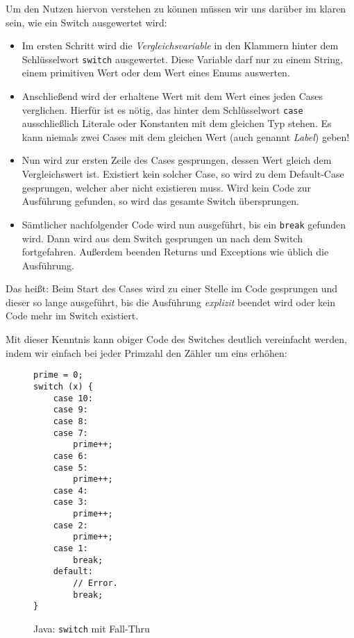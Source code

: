 		Um den Nutzen hiervon verstehen zu können müssen wir uns darüber im klaren sein, wie ein Switch ausgewertet wird:
		\begin{itemize}
			\item Im ersten Schritt wird die \textit{Vergleichsvariable} in den Klammern hinter dem Schlüsselwort \texttt{switch} ausgewertet. Diese Variable darf nur zu einem String, einem primitiven Wert oder dem Wert eines Enums auswerten.
			\item Anschließend wird der erhaltene Wert mit dem Wert eines jeden Cases verglichen. Hierfür ist es nötig, das hinter dem Schlüsselwort \texttt{case} ausschließlich Literale oder Konstanten mit dem gleichen Typ stehen. Es kann niemals zwei Cases mit dem gleichen Wert (auch genannt \textit{Label}) geben!
			\item Nun wird zur ersten Zeile des Cases gesprungen, dessen Wert gleich dem Vergleichswert ist. Existiert kein solcher Case, so wird zu dem Default-Case gesprungen, welcher aber nicht existieren muss. Wird kein Code zur Ausführung gefunden, so wird das gesamte Switch übersprungen.
			\item Sämtlicher nachfolgender Code wird nun ausgeführt, bis ein \texttt{break} gefunden wird. Dann wird aus dem Switch gesprungen un nach dem Switch fortgefahren. Außerdem beenden Returns und Exceptions wie üblich die Ausführung.
		\end{itemize}
		
		Das heißt: Beim Start des Cases wird zu einer Stelle im Code gesprungen und dieser so lange ausgeführt, bis die Ausführung \textit{explizit} beendet wird oder kein Code mehr im Switch existiert.
		
		Mit dieser Kenntnis kann obiger Code des Switches deutlich vereinfacht werden, indem wir einfach bei jeder Primzahl den Zähler um eins erhöhen:
		\begin{figure}[H]
			\centering
			\begin{lstlisting}
prime = 0;
switch (x) {
	case 10:
	case 9:
	case 8:
	case 7:
		prime++;
	case 6:
	case 5:
		prime++;
	case 4:
	case 3:
		prime++;
	case 2:
		prime++;
	case 1:
		break;
	default:
		// Error.
		break;
}
			\end{lstlisting}
			\caption{Java: \texttt{switch} mit Fall-Thru}
		\end{figure}
		

